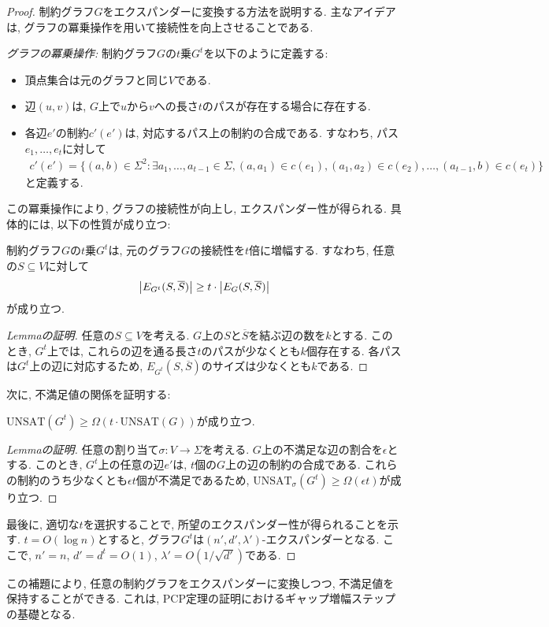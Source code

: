 \begin{proof}
  制約グラフ$G$をエクスパンダーに変換する方法を説明する. 主なアイデアは, グラフの冪乗操作を用いて接続性を向上させることである.

  \emph{グラフの冪乗操作:}
  制約グラフ$G$の$t$乗$G^t$を以下のように定義する:
  \begin{itemize}
  \item 頂点集合は元のグラフと同じ$V$である.
  \item 辺$(u,v)$は, $G$上で$u$から$v$への長さ$t$のパスが存在する場合に存在する.
  \item 各辺$e'$の制約$c'(e')$は, 対応するパス上の制約の合成である. すなわち, パス$e_1,\dots,e_t$に対して
    \begin{align*}
      c'(e') = \{(a,b) \in \Sigma^2 : \exists a_1,\dots,a_{t-1} \in \Sigma, (a,a_1) \in c(e_1), (a_1,a_2) \in c(e_2), \dots, (a_{t-1},b) \in c(e_t)\}
    \end{align*}
    と定義する.
  \end{itemize}

  この冪乗操作により, グラフの接続性が向上し, エクスパンダー性が得られる. 具体的には, 以下の性質が成り立つ:

  \begin{lemma}{}{}
    制約グラフ$G$の$t$乗$G^t$は, 元のグラフ$G$の接続性を$t$倍に増幅する. すなわち, 任意の$S\subseteq V$に対して
    \begin{align*}
      \abs{E_{G^t}(S,\overline{S})} \ge t \cdot \abs{E_G(S,\overline{S})}
    \end{align*}
    が成り立つ.
  \end{lemma}

  \begin{proof}[Lemmaの証明]
    任意の$S\subseteq V$を考える. $G$上の$S$と$\overline{S}$を結ぶ辺の数を$k$とする.
    このとき, $G^t$上では, これらの辺を通る長さ$t$のパスが少なくとも$k$個存在する.
    各パスは$G^t$上の辺に対応するため, $E_{G^t}(S,\overline{S})$のサイズは少なくとも$k$である.
  \end{proof}

  次に, 不満足値の関係を証明する:

  \begin{lemma}{}{}
    $\mathrm{UNSAT}(G^t) \ge \Omega(t \cdot \mathrm{UNSAT}(G))$が成り立つ.
  \end{lemma}

  \begin{proof}[Lemmaの証明]
    任意の割り当て$\sigma: V \rightarrow \Sigma$を考える. $G$上の不満足な辺の割合を$\epsilon$とする.
    このとき, $G^t$上の任意の辺$e'$は, $t$個の$G$上の辺の制約の合成である.
    これらの制約のうち少なくとも$\epsilon t$個が不満足であるため,
    $\mathrm{UNSAT}_{\sigma}(G^t) \ge \Omega(\epsilon t)$が成り立つ.
  \end{proof}

  最後に, 適切な$t$を選択することで, 所望のエクスパンダー性が得られることを示す.
  $t=O(\log n)$とすると, グラフ$G^t$は$(n',d',\lambda')$-エクスパンダーとなる.
  ここで, $n'=n$, $d'=d^t=O(1)$, $\lambda'=O(1/\sqrt{d'})$である.
\end{proof}

この補題により, 任意の制約グラフをエクスパンダーに変換しつつ, 不満足値を保持することができる.
これは, PCP定理の証明におけるギャップ増幅ステップの基礎となる.